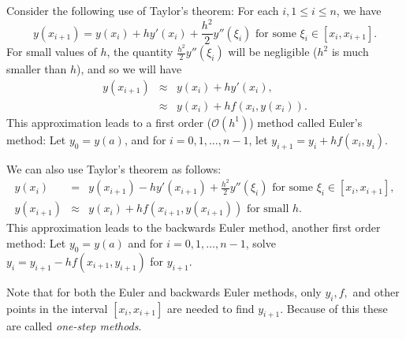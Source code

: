 Consider the following use of Taylor's theorem: For each $i, 1 \leq i \leq n$, we have
\[
y(x_{i+1}) = y(x_{i}) + h y'(x_i) + \frac{h^2}{2} y''(\xi_i)\text{ for some }\xi_i \in [x_i,x_{i+1}].
\]
For small values of $h$, the quantity $\frac{h^2}{2} y''(\xi_i)$ will be negligible ($h^2$ is much smaller than $h$), and so we will have
\begin{eqnarray*}
y(x_{i+1}) &\approx& y(x_{i}) + h y'(x_i)  ,\\
&\approx & y(x_{i}) + h f(x_i,y(x_i)).
\end{eqnarray*}
This approximation leads to a first order ($\mathcal{O}(h^1)$) method called Euler's method: Let $y_0 = y(a)$, and for $i = 0, 1, \hdots, n-1$, let $y_{i+1} = y_i +hf(x_i,y_i)$. 

We can also use Taylor's theorem as follows: 
\begin{eqnarray*}
y(x_{i}) &=& y(x_{i+1}) - h y'(x_{i+1}) + \frac{h^2}{2} y''(\xi_i) \text{ for some } \xi_i \in [x_i,x_{i+1}], \\
y(x_{i+1}) &\approx & y(x_{i}) + h f(x_{i+1},y(x_{i+1}))  \text{ for small } h .
\end{eqnarray*}
This approximation leads to the backwards Euler method, another first order method: Let $y_0 = y(a)$ and for $i = 0, 1, \hdots, n-1$, solve  $y_{i} = y_{i+1}-hf(x_{i+1},y_{i+1})$ for $y_{i+1}$.

Note that for both the Euler and backwards Euler methods, only $y_i, f, $ and other points in the interval $[x_i, x_{i+1}]$ are needed to find $y_{i+1}$. Because of this these are called \textit{one-step methods}. 




